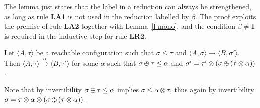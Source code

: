 \documentclass{llncs}
\def\monid{{\mathbf 0}}
\def\odiv{\, {\ominus\hspace{-7.7pt} \div} \,}
\def\monid{\mathbf{1}}
\begin{document}
The lemma just states that the label in a reduction can always be strengthened,
as long as rule  {\bf LA1} is not used in the reduction labelled by $\beta$.
The proof exploits the premise of rule {\bf LA2} together with Lemma~\ref{l-mono},
and the condition $\beta \neq \monid$ is required in the inductive step for rule  {\bf LR2}.

\begin{theorem}[Completeness]
Let $\langle A, \tau \rangle$ be a reachable configuration such that
$\sigma \leq \tau$ and
$\langle A, \sigma \rangle \to \langle B, \sigma' \rangle$. 
Then 
$\langle A, \tau \rangle \xrightarrow{\alpha} \langle B, \tau' \rangle$
for some $\alpha$ such that $\sigma \odiv \tau \leq \alpha$
and $\sigma' = \tau' \otimes (\sigma \odiv (\tau \otimes \alpha))$.
\end{theorem}

Note that by invertibility $\sigma \odiv \tau \leq \alpha$ implies $\sigma \leq \alpha \otimes \tau$,
thus again by invertibility $\sigma = \tau \otimes \alpha \otimes (\sigma \odiv (\tau \otimes \alpha))$.
\end{document}
